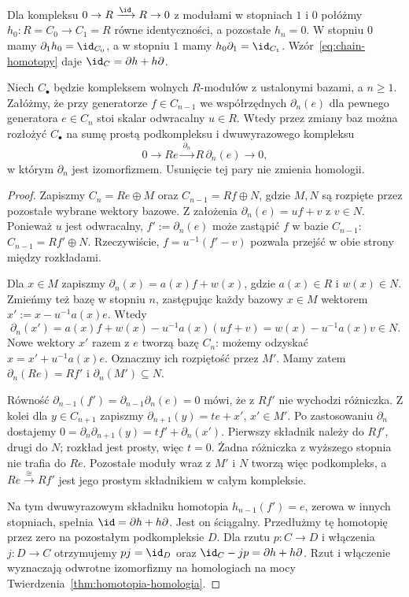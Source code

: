 \begin{przyklad}
Dla kompleksu
$0\to R\xrightarrow{\id}R\to0$
z modułami w stopniach $1$ i $0$
połóżmy $h_0:R=C_0\to C_1=R$
równe identyczności, a pozostałe
$h_n=0$. W stopniu $0$ mamy
$\partial_1h_0=\id_{C_0}$, a w stopniu
$1$ mamy $h_0\partial_1=\id_{C_1}$.
Wzór~\eqref{eq:chain-homotopy}
daje $\id_C=\partial h+h\partial$.
\end{przyklad}

\begin{twierdzenie}
\label{thm:kasowanie-pary}
Niech $C_\bullet$ będzie kompleksem
wolnych $R$-modułów z ustalonymi
bazami, a $n\geq1$. Załóżmy, że
przy generatorze $f\in C_{n-1}$
we współrzędnych $\partial_n(e)$ dla pewnego
generatora $e\in C_n$ stoi skalar
odwracalny $u\in R$.
Wtedy przez zmiany baz można rozłożyć
$C_\bullet$ na sumę prostą
podkompleksu i dwuwyrazowego kompleksu
\[
 0\longrightarrow R e
 \xrightarrow{\ \partial_n\ }R\,\partial_n(e)
 \longrightarrow0,
\]
w którym $\partial_n$ jest izomorfizmem.
Usunięcie tej pary nie zmienia homologii.
\end{twierdzenie}
\begin{proof}
Zapiszmy
$C_n=R e\oplus M$ oraz
$C_{n-1}=R f\oplus N$, gdzie
$M,N$ są rozpięte przez pozostałe
wybrane wektory bazowe.
Z założenia
$\partial_n(e)=u f+v$ z $v\in N$.
Ponieważ $u$ jest odwracalny,
$f':=\partial_n(e)$ może zastąpić $f$
w bazie $C_{n-1}$:
$C_{n-1}=R f'\oplus N$.
Rzeczywiście, $f=u^{-1}(f'-v)$
pozwala przejść w obie strony
między rozkładami.

Dla $x\in M$ zapiszmy
$\partial_n(x)=a(x)f+w(x)$,
gdzie $a(x)\in R$ i $w(x)\in N$.
Zmieńmy też bazę w stopniu $n$,
zastępując każdy bazowy $x\in M$
wektorem $x':=x-u^{-1}a(x)e$.
Wtedy
\[
 \partial_n(x')
 =a(x)f+w(x)-u^{-1}a(x)(uf+v)
 =w(x)-u^{-1}a(x)v\in N.
\]
Nowe wektory $x'$ razem z $e$
tworzą bazę $C_n$: możemy odzyskać
$x=x'+u^{-1}a(x)e$.
Oznaczmy ich rozpiętość przez $M'$.
Mamy zatem $\partial_n(Re)=Rf'$
i $\partial_n(M')\subseteq N$.

Równość $\partial_{n-1}(f')=\partial_{n-1}\partial_n(e)=0$
mówi, że z $Rf'$ nie wychodzi
różniczka. Z kolei dla $y\in C_{n+1}$
zapiszmy $\partial_{n+1}(y)=t e+x'$,
$x'\in M'$. Po zastosowaniu $\partial_n$
dostajemy
$0=\partial_n\partial_{n+1}(y)=t f'+\partial_n(x')$.
Pierwszy składnik należy do $Rf'$,
drugi do $N$; rozkład jest prosty,
więc $t=0$. Żadna różniczka
z wyższego stopnia nie trafia do $Re$.
Pozostałe moduły wraz z $M'$ i $N$
tworzą więc podkompleks, a
$Re\xrightarrow{\cong}Rf'$
jest jego prostym składnikiem
w całym kompleksie.

Na tym dwuwyrazowym składniku
homotopia $h_{n-1}(f')=e$,
zerowa w innych stopniach,
spełnia $\id=\partial h+h\partial$.
Jest on ściągalny. Przedłużmy tę homotopię przez zero na
pozostałym podkompleksie $D$. Dla rzutu $p:C\to D$ i włączenia
$j:D\to C$ otrzymujemy $pj=\id_D$ oraz
$\id_C-jp=\partial h+h\partial$. Rzut i włączenie
wyznaczają odwrotne izomorfizmy
na homologiach na mocy
Twierdzenia~\ref{thm:homotopia-homologia}.
\end{proof}


